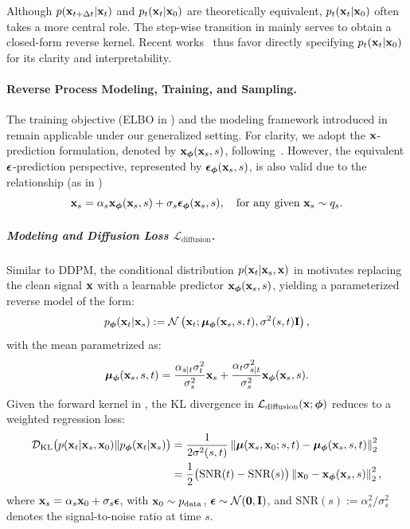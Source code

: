 Although $p({\mathbf{x}}_{t + \Delta t}|{\mathbf{x}}_t)$ and $p_t({\mathbf{x}}_t|{\mathbf{x}}_0)$ are theoretically equivalent, $p_t({\mathbf{x}}_t|{\mathbf{x}}_0)$ often takes a more central role. The step-wise transition in  mainly serves to obtain a closed-form reverse kernel. Recent works~\citep{kingma2021variational} thus favor directly specifying $p_t({\mathbf{x}}_t|{\mathbf{x}}_0)$ for its clarity and interpretability.



\paragraph{Reverse Process Modeling, Training, and Sampling.}  
The training objective (ELBO in ) and the modeling framework introduced in  remain applicable under our generalized setting. For clarity, we adopt the ${\mathbf{x}}$-prediction formulation, denoted by ${\mathbf{x}}_{\bm{\phi}}({\mathbf{x}}_s, s)$, following~\citet{kingma2021variational}. However, the equivalent ${\bm{\epsilon}}$-prediction perspective, represented by $\bm{\epsilon}_{\bm{\phi}}({\mathbf{x}}_s, s)$, is also valid due to the relationship (as in )
\[
{\mathbf{x}}_s = \alpha_s {\mathbf{x}}_{\bm{\phi}}({\mathbf{x}}_s, s) + \sigma_s \bm{\epsilon}_{\bm{\phi}}({\mathbf{x}}_s, s),\quad \text{for any given } {\mathbf{x}}_s \sim q_s.
\]

\subparagraph{Modeling and Diffusion Loss $\mathcal{L}_{\text{diffusion}}$.}  
Similar to DDPM, the conditional distribution $p({\mathbf{x}}_t|{\mathbf{x}}_s, {\mathbf{x}})$ in  motivates replacing the clean signal ${\mathbf{x}}$ with a learnable predictor ${\mathbf{x}}_{\bm{\phi}}({\mathbf{x}}_s, s)$, yielding a parameterized reverse model of the form:
\begin{align}\label{eq:general-ddpm-sampling}
    p_{\bm{\phi}}({\mathbf{x}}_t | {\mathbf{x}}_s) := \mathcal{N}\left({\mathbf{x}}_t; \bm{\mu}_{\bm{\phi}}({\mathbf{x}}_s, s, t), \sigma^2(s,t) \mathbf{I}\right),
\end{align}
with the mean parametrized as:
\[
    \bm{\mu}_{\bm{\phi}}({\mathbf{x}}_s, s, t) = \frac{\alpha_{s|t} \sigma_t^2}{\sigma_s^2} {\mathbf{x}}_s + \frac{\alpha_t \sigma_{s|t}^2}{\sigma_s^2} {\mathbf{x}}_{\bm{\phi}}({\mathbf{x}}_s, s).
\]
Given the forward kernel in , the KL divergence in $\mathcal{L}_{\text{diffusion}}({\mathbf{x}}; \bm{\phi})$ reduces to a weighted regression loss:
\begin{align}
\begin{aligned}
    \label{eq:snr-kl}
    \mathcal{D}_{\text{KL}}\big(p({\mathbf{x}}_t|{\mathbf{x}}_s, {\mathbf{x}}_0)  \| p_{\bm{\phi}}({\mathbf{x}}_t|{\mathbf{x}}_s)\big)  
    &= \frac{1}{2\sigma^2(s,t)} \left\| \bm{\mu}({\mathbf{x}}_s, {\mathbf{x}}_0; s,t) - \bm{\mu}_{\bm{\phi}}({\mathbf{x}}_s, s, t) \right\|_2^2 \\
    &= \frac{1}{2} \big(\text{SNR}(t) - \text{SNR}(s)\big) \left\| {\mathbf{x}}_0 - {\mathbf{x}}_{\bm{\phi}}({\mathbf{x}}_s, s) \right\|_2^2,
\end{aligned}
\end{align}
where ${\mathbf{x}}_s = \alpha_s{\mathbf{x}}_0 + \sigma_s\bm{\epsilon}$, with ${\mathbf{x}}_0 \sim p_{\mathrm{data}}$, $\bm{\epsilon} \sim \mathcal{N}(\bm{0}, {\mathbf{I}})$, and $\text{SNR}(s) := \alpha_s^2 / \sigma_s^2$ denotes the signal-to-noise ratio at time $s$.


